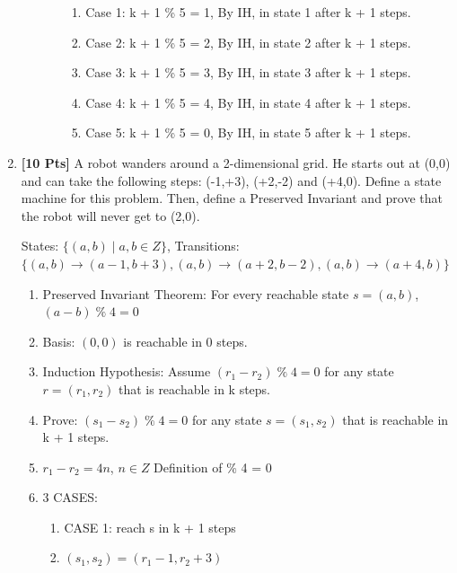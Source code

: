 \documentclass[11pt]{article}
\begin{document}
\begin{enumerate}
\begin{enumerate}
\begin{enumerate}
                \begin{enumerate}
                    \item Case 1: k + 1 \% 5 = 1, By IH, in state 1 after k + 1 steps.
                    \item Case 2: k + 1 \% 5 = 2, By IH, in state 2 after k + 1 steps.
                    \item Case 3: k + 1 \% 5 = 3, By IH, in state 3 after k + 1 steps.
                    \item Case 4: k + 1 \% 5 = 4, By IH, in state 4 after k + 1 steps.
                    \item Case 5: k + 1 \% 5 = 0, By IH, in state 5 after k + 1 steps.
                \end{enumerate}
            \end{enumerate}
        \end{enumerate}
        \newpage
        \item {\bf [10 Pts]} A robot wanders around a 2-dimensional grid. He starts out at (0,0) and can take the following steps: (-1,+3), (+2,-2) and (+4,0).
        Define a state machine for this problem. Then, define a Preserved Invariant and prove that the robot will never get to (2,0).
        \begin{center}
            States: $\{ (a,b)\;|\; a, b \in Z\}$, Transitions: $\{ (a, b) \to (a - 1, b + 3), (a, b) \to (a + 2, b - 2), (a, b) \to (a + 4, b)\}$
        \end{center}
        \begin{enumerate}
            \item Preserved Invariant Theorem: For every reachable state $s = (a, b)$, $(a - b)\;\%\; 4 = 0$
            \item Basis: $(0, 0)$ is reachable in 0 steps.
            \item Induction Hypothesis: Assume $(r_1 - r_2)\;\%\; 4 = 0$ for any state $r = (r_1, r_2)$ that is reachable in k steps.
            \item Prove: $(s_1 - s_2)\;\%\; 4 = 0$ for any state $s = (s_1, s_2)$ that is reachable in k + 1 steps.
            \item $r_1 - r_2 = 4n$, $n \in Z$ \null\hfill Definition of \% 4 = 0
            \item 3 CASES:
            \begin{enumerate}
                \item CASE 1: reach s in k + 1 steps
                \item $(s_1, s_2) = (r_1 - 1, r_2 + 3)$

\end{enumerate}
\end{enumerate}
\end{enumerate}
\end{document}
